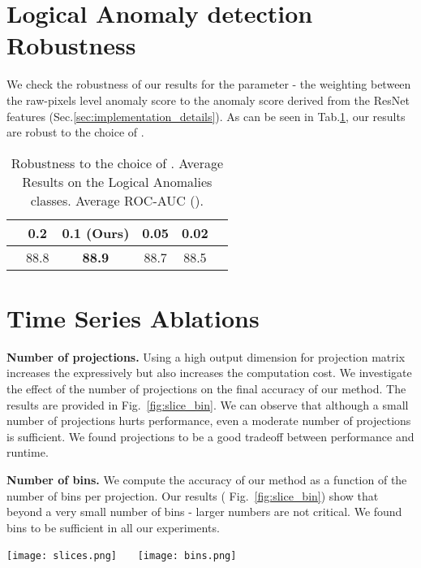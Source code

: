 \documentclass{article}
\begin{document}
\section{Logical Anomaly detection Robustness }
\label{app:loco_robust}
We check the robustness of our results for the parameter  - the weighting between the raw-pixels level anomaly score to the anomaly score derived from the ResNet features (Sec.\ref{sec:implementation_details}). As can be seen in Tab.\ref{tab:lambda_robust}, our results are robust to the choice of .


\begin{table}
\caption{Robustness to the choice of . Average Results on the Logical Anomalies classes. Average ROC-AUC  ().}
\centering
\begin{tabular}{lccccc}
\toprule

	 &	0.2	&	0.1 (Ours)		&	0.05	&	0.02	\\ \midrule

	&	88.8	&	\textbf{88.9}	&	88.7			&	88.5 \\


\bottomrule
\end{tabular}
\label{tab:lambda_robust}
\end{table}


\section{Time Series Ablations}
\label{app:ablations}

\textbf{Number of projections.} Using a high output dimension for projection matrix  increases the expressively but also increases the computation cost. We investigate the effect of the number of projections on the final accuracy of our method. The results are provided in Fig.~\ref{fig:slice_bin}. We can observe that although a small number of projections hurts performance, even a moderate number of projections is sufficient. We found  projections to be a good tradeoff between performance and runtime.

\textbf{Number of bins.} We compute the accuracy of our method as a function of the number of bins per projection. Our results ( Fig.~\ref{fig:slice_bin}) show that beyond a very small number of bins - larger numbers are not critical. We found  bins to be sufficient in all our experiments.

\begin{figure*}
  \centering
  \texttt{[image: slices.png]}~~~
  \texttt{[image: bins.png]}
  \caption{Ablation of accuracy vs. the number of projections (left) and the number of bins (right). }
  \label{fig:slice_bin}
  \vspace{5pt}
\end{figure*}
\end{document}
